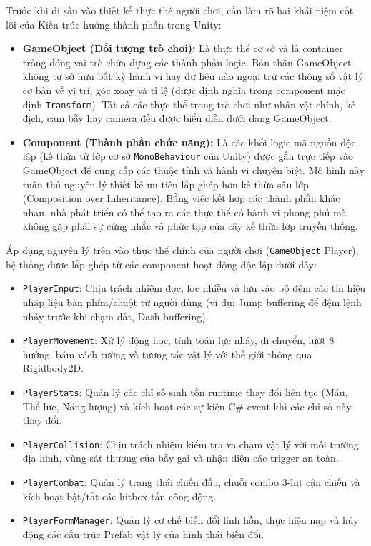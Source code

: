 \documentclass[../DoAn.tex]{subfiles}
\begin{document}
Trước khi đi sâu vào thiết kế thực thể người chơi, cần làm rõ hai khái niệm cốt lõi của Kiến trúc hướng thành phần trong Unity:
\begin{itemize}
    \item \textbf{GameObject (Đối tượng trò chơi):} Là thực thể cơ sở và là container trống đóng vai trò chứa đựng các thành phần logic. Bản thân GameObject không tự sở hữu bất kỳ hành vi hay dữ liệu nào ngoại trừ các thông số vật lý cơ bản về vị trí, góc xoay và tỉ lệ (được định nghĩa trong component mặc định \texttt{Transform}). Tất cả các thực thể trong trò chơi như nhân vật chính, kẻ địch, cạm bẫy hay camera đều được biểu diễn dưới dạng GameObject.
    \item \textbf{Component (Thành phần chức năng):} Là các khối logic mã nguồn độc lập (kế thừa từ lớp cơ sở \texttt{MonoBehaviour} của Unity) được gắn trực tiếp vào GameObject để cung cấp các thuộc tính và hành vi chuyên biệt. Mô hình này tuân thủ nguyên lý thiết kế ưu tiên lắp ghép hơn kế thừa sâu lớp (Composition over Inheritance). Bằng việc kết hợp các thành phần khác nhau, nhà phát triển có thể tạo ra các thực thể có hành vi phong phú mà không gặp phải sự cứng nhắc và phức tạp của cây kế thừa lớp truyền thống.
\end{itemize}

Áp dụng nguyên lý trên vào thực thể chính của người chơi (\texttt{GameObject} Player), hệ thống được lắp ghép từ các component hoạt động độc lập dưới đây:
\begin{itemize}
    \item \texttt{PlayerInput}: Chịu trách nhiệm đọc, lọc nhiễu và lưu vào bộ đệm các tín hiệu nhập liệu bàn phím/chuột từ người dùng (ví dụ: Jump buffering để đệm lệnh nhảy trước khi chạm đất, Dash buffering).
    \item \texttt{PlayerMovement}: Xử lý động học, tính toán lực nhảy, di chuyển, lướt 8 hướng, bám vách tường và tương tác vật lý với thế giới thông qua Rigidbody2D.
    \item \texttt{PlayerStats}: Quản lý các chỉ số sinh tồn runtime thay đổi liên tục (Máu, Thể lực, Năng lượng) và kích hoạt các sự kiện C\# event khi các chỉ số này thay đổi.
    \item \texttt{PlayerCollision}: Chịu trách nhiệm kiểm tra va chạm vật lý với môi trường địa hình, vùng sát thương của bẫy gai và nhận diện các trigger an toàn.
    \item \texttt{PlayerCombat}: Quản lý trạng thái chiến đấu, chuỗi combo 3-hit cận chiến và kích hoạt bật/tắt các hitbox tấn công động.
    \item \texttt{PlayerFormManager}: Quản lý cơ chế biến đổi linh hồn, thực hiện nạp và hủy động các cấu trúc Prefab vật lý của hình thái biến đổi.
\end{itemize}
\end{document}
